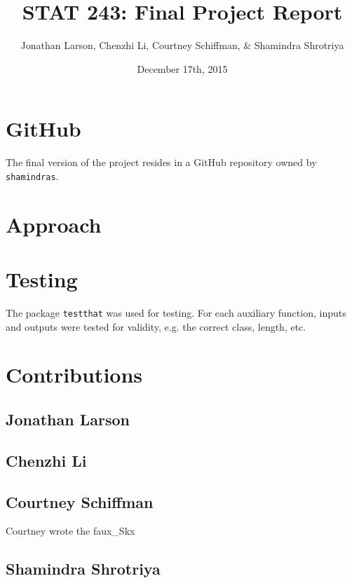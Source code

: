 \documentclass{article}
\begin{document}
\title{STAT 243: Final Project Report}
\author{Jonathan Larson, Chenzhi Li, Courtney Schiffman, \& Shamindra Shrotriya}
\date{December 17th, 2015}

\maketitle

\section{GitHub}

The final version of the project resides in a GitHub repository owned by
\texttt{shamindras}.

\section{Approach}



\section{Testing}

The package \texttt{testthat} was used for testing.
For each auxiliary function, inputs and outputs were tested for validity,
e.g. the correct class, length, etc.

\section{Contributions}

\subsection{Jonathan Larson}



\subsection{Chenzhi Li}



\subsection{Courtney Schiffman}

Courtney wrote the faux_Skx

\subsection{Shamindra Shrotriya}
\end{document}
